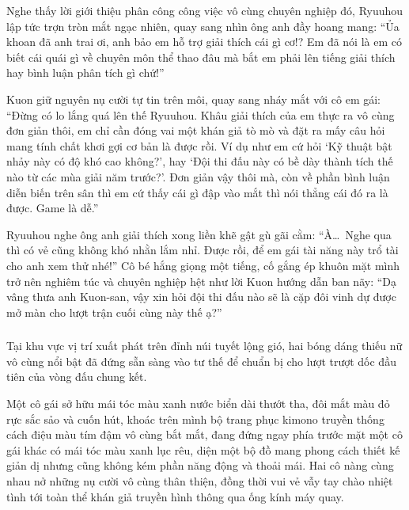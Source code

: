 \documentclass[../main.tex]{subfiles}
\begin{document}
Nghe thấy lời giới thiệu phân công công việc vô cùng chuyên nghiệp đó, Ryuuhou lập tức trợn tròn mắt ngạc nhiên, quay sang nhìn ông anh đầy hoang mang: ``Ủa khoan đã anh trai ơi, anh bảo em hỗ trợ giải thích cái gì cơ!? Em đã nói là em có biết cái quái gì về chuyên môn thể thao đâu mà bắt em phải lên tiếng giải thích hay bình luận phân tích gì chứ!''

Kuon giữ nguyên nụ cười tự tin trên môi, quay sang nháy mắt với cô em gái: ``Đừng có lo lắng quá lên thế Ryuuhou. Khâu giải thích của em thực ra vô cùng đơn giản thôi, em chỉ cần đóng vai một khán giả tò mò và đặt ra mấy câu hỏi mang tính chất khơi gợi cơ bản là được rồi. Ví dụ như em cứ hỏi `Kỹ thuật bật nhảy này có độ khó cao không?', hay `Đội thi đấu này có bề dày thành tích thế nào từ các mùa giải năm trước?'. Đơn giản vậy thôi mà, còn về phần bình luận diễn biến trên sân thì em cứ thấy cái gì đập vào mắt thì nói thẳng cái đó ra là được. {\color{blue} Game là dễ.}''

Ryuuhou nghe ông anh giải thích xong liền khẽ gật gù gãi cằm: ``À\dots\ Nghe qua thì có vẻ cũng không khó nhằn lắm nhỉ. Được rồi, để em gái tài năng này trổ tài cho anh xem thử nhé!'' Cô bé hắng giọng một tiếng, cố gắng ép khuôn mặt mình trở nên nghiêm túc và chuyên nghiệp hệt như lời Kuon hướng dẫn ban nãy: ``Dạ vâng thưa anh Kuon-san, vậy xin hỏi đội thi đấu nào sẽ là cặp đôi vinh dự được mở màn cho lượt trận cuối cùng này thế ạ?''

\subsubsection*{\label{ep-003.I}}

Tại khu vực vị trí xuất phát trên đỉnh núi tuyết lộng gió, hai bóng dáng thiếu nữ vô cùng nổi bật đã đứng sẵn sàng vào tư thế để chuẩn bị cho lượt trượt dốc đầu tiên của vòng đấu chung kết.

Một cô gái sở hữu mái tóc màu xanh nước biển dài thướt tha, đôi mắt màu đỏ rực sắc sảo và cuốn hút, khoác trên mình bộ trang phục kimono truyền thống cách điệu màu tím đậm vô cùng bắt mắt, đang đứng ngay phía trước mặt một cô gái khác có mái tóc màu xanh lục rêu, diện một bộ đồ mang phong cách thiết kế giản dị nhưng cũng không kém phần năng động và thoải mái. Hai cô nàng cùng nhau nở những nụ cười vô cùng thân thiện, đồng thời vui vẻ vẫy tay chào nhiệt tình tới toàn thể khán giả truyền hình thông qua ống kính máy quay.
\end{document}

